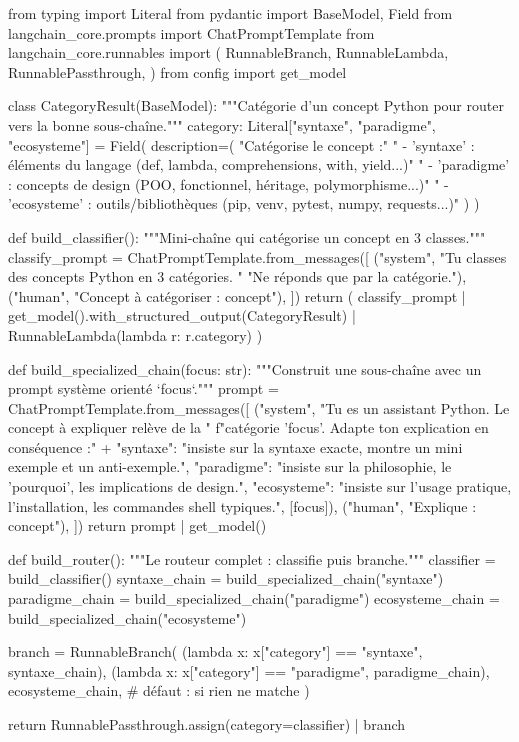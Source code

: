 \documentclass[11pt,a4paper]{article}
\begin{document}
\begin{pythoncode}
from typing import Literal
from pydantic import BaseModel, Field
from langchain_core.prompts import ChatPromptTemplate
from langchain_core.runnables import (
    RunnableBranch, RunnableLambda, RunnablePassthrough,
)
from config import get_model


class CategoryResult(BaseModel):
    """Catégorie d'un concept Python pour router vers la bonne sous-chaîne."""
    category: Literal["syntaxe", "paradigme", "ecosysteme"] = Field(
        description=(
            "Catégorise le concept :\n"
            " - 'syntaxe'    : éléments du langage (def, lambda, comprehensions, with, yield...)\n"
            " - 'paradigme'  : concepts de design (POO, fonctionnel, héritage, polymorphisme...)\n"
            " - 'ecosysteme' : outils/bibliothèques (pip, venv, pytest, numpy, requests...)"
        )
    )


def build_classifier():
    """Mini-chaîne qui catégorise un concept en 3 classes."""
    classify_prompt = ChatPromptTemplate.from_messages([
        ("system", "Tu classes des concepts Python en 3 catégories. "
                   "Ne réponds que par la catégorie."),
        ("human",  "Concept à catégoriser : {concept}"),
    ])
    return (
        classify_prompt
        | get_model().with_structured_output(CategoryResult)
        | RunnableLambda(lambda r: r.category)
    )


def build_specialized_chain(focus: str):
    """Construit une sous-chaîne avec un prompt système orienté `focus`."""
    prompt = ChatPromptTemplate.from_messages([
        ("system",
         "Tu es un assistant Python. Le concept à expliquer relève de la "
         f"catégorie '{focus}'. Adapte ton explication en conséquence :\n" +
         {
             "syntaxe":    "insiste sur la syntaxe exacte, montre un mini exemple et un anti-exemple.",
             "paradigme":  "insiste sur la philosophie, le 'pourquoi', les implications de design.",
             "ecosysteme": "insiste sur l'usage pratique, l'installation, les commandes shell typiques.",
         }[focus]),
        ("human", "Explique : {concept}"),
    ])
    return prompt | get_model()


def build_router():
    """Le routeur complet : classifie puis branche."""
    classifier        = build_classifier()
    syntaxe_chain     = build_specialized_chain("syntaxe")
    paradigme_chain   = build_specialized_chain("paradigme")
    ecosysteme_chain  = build_specialized_chain("ecosysteme")

    branch = RunnableBranch(
        (lambda x: x["category"] == "syntaxe",   syntaxe_chain),
        (lambda x: x["category"] == "paradigme", paradigme_chain),
        ecosysteme_chain,  # défaut : si rien ne matche
    )

    return RunnablePassthrough.assign(category=classifier) | branch
\end{pythoncode}
\end{document}
